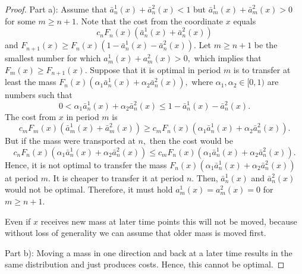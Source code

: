 \documentclass[reqno, 12pt]{amsart}%
\theoremstyle{definition}
\numberwithin{equation}{section} \numberwithin{theorem}{section}
\begin{document}
\begin{proof} Part a): 
Assume that $\bar a_n^1(x)+\bar a_n^2(x)< 1$
but $\bar a_m^1(x)+\bar a_m^2(x)>0$
for some $m\ge n+1.$ Note that the cost from the coordinate $x$ equals
$$c_nF_n(x)(\bar a_n^1(x)+\bar a_n^2(x))$$
and $F_{n+1}(x)\ge F_n(x)(1-\bar a_n^1(x)-\bar a_n^2(x)).$   Let $m\ge n+1$ be the smallest  number for which
$a_m^1(x)+a^2_m(x)>0,$ which implies that $F_m(x)\ge F_{n+1}(x).$ 
Suppose that it is optimal in period $m$ is to transfer at least the mass $F_n(x)(\alpha_1\bar a_n^1(x)+\alpha_2\bar a_n^2(x)),$ where $\alpha_1,\alpha_2\in [0,1)$ are numbers such that 
$$0<\alpha_1\bar a_n^1(x)+\alpha_2\bar a_n^2(x)\le 1-
\bar a_n^1(x)-\bar a_n^2(x).$$
The cost from $x$ in period $m$ is 
$$c_mF_m(x)(\bar a_m^1(x)+\bar a_m^2(x))\ge
c_m F_n(x)(\alpha_1\bar a_n^1(x)+\alpha_2\bar a_n^2(x)).
$$
But if the mass were transported at $n,$ then the cost would be 
 $$c_n F_n(x)(\alpha_1 \bar a_n^1(x)+\alpha_2 \bar a_n^2(x))\le c_m  F_n(x)(\alpha_1\bar a_n^1(x)+\alpha_2\bar a_n^2(x)).$$
 Hence, it is not optimal  to transfer the mass 
 $F_n(x)(\alpha_1 \bar a_n^1(x)+\alpha_2 \bar a_n^2(x))$ at period $m.$ 
 It is cheaper to transfer it at period $n$. Then, 
 $\bar a^1_n(x)$ and $\bar a^2_n(x)$ would not be optimal.
 Therefore, it must hold $a_m^1(x)=a^2_m(x)=0$ for 
 $m\ge n+1.$

 Even if $x$ receives new mass at later time 
points this will not be moved, because without 
loss of generality we can assume that older 
mass is moved first.





Part b): Moving a mass in one direction and 
back at a later time results in the same 
distribution and just produces costs. Hence, 
this cannot be optimal.
\end{proof}
\end{document}
